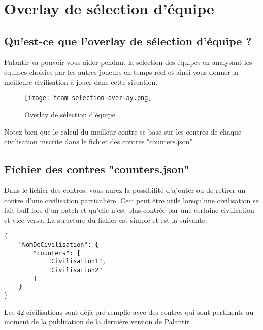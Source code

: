 
\section{Overlay de sélection d'équipe}
\subsection{Qu'est-ce que l'overlay de sélection d'équipe ?}
Palantir va pouvoir vous aider pendant la sélection des équipes en analysant les équipes choisies par les autres joueurs en temps réel et ainsi vous donner la meilleure civilisation à jouer dans cette situation.

\begin{figure}[ht!]
    \begin{center}
        \texttt{[image: team-selection-overlay.png]}
    \end{center}
    \caption{Overlay de sélection d'équipe}
\end{figure}

Notez bien que le calcul du meilleur contre se base sur les contres de chaque civilisation inscrite dans le fichier des contres "counters.json".

\subsection{Fichier des contres "counters.json"}
Dans le fichier des contres, vous aurez la possibilité d'ajouter ou de retirer un contre d'une civilisation particulière. Ceci peut être utile lorsqu'une civilisation se fait buff lors d'un patch et qu'elle n'est plus contrée par une certaine civilisation et vice-versa. La structure du fichier est simple et est la suivante:
\begin{verbatim}
{
    "NomDeCivilisation": {
        "counters": [
            "Civilisation1",
            "Civilisation2"
        ]
    }
}
\end{verbatim}

Les 42 civilisations sont déjà pré-remplie avec des contres qui sont pertinents au moment de la publication de la dernière version de Palantir.